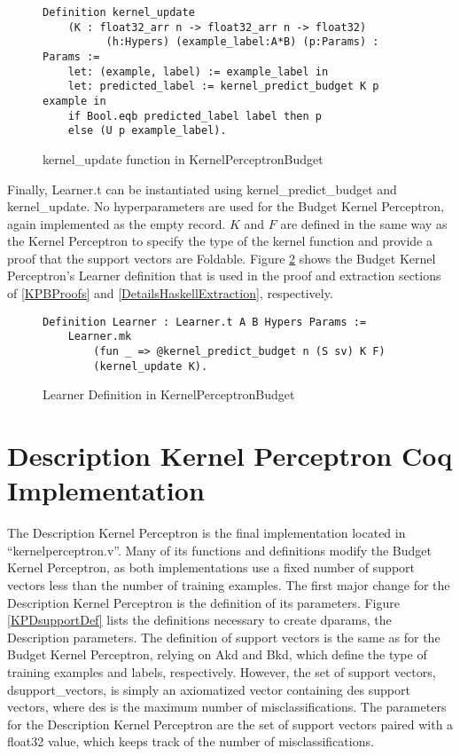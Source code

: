 \begin{figure}
    \caption{kernel\_update function in KernelPerceptronBudget}
    \label{kernel_update_budgetDef}
    \begin{lstlisting}
Definition kernel_update 
    (K : float32_arr n -> float32_arr n -> float32)
          (h:Hypers) (example_label:A*B) (p:Params) : Params :=
    let: (example, label) := example_label in 
    let: predicted_label := kernel_predict_budget K p example in
    if Bool.eqb predicted_label label then p
    else (U p example_label).
    \end{lstlisting}
\end{figure}

Finally, Learner.t can be instantiated using kernel\_predict\_budget and kernel\_update. No hyperparameters are used for the Budget Kernel Perceptron, again implemented as the empty record. $K$ and $F$ are defined in the same way as the Kernel Perceptron to specify the type of the kernel function and provide a proof that the support vectors are Foldable. Figure \ref{kpbLearnerDef} shows the Budget Kernel Perceptron's Learner definition that is used in the proof and extraction sections of \ref{KPBProofs} and \ref{DetailsHaskellExtraction}, respectively.

\begin{figure}
    \caption{Learner Definition in KernelPerceptronBudget}
    \label{kpbLearnerDef}
    \begin{lstlisting}
Definition Learner : Learner.t A B Hypers Params :=
    Learner.mk
        (fun _ => @kernel_predict_budget n (S sv) K F)
        (kernel_update K).
    \end{lstlisting}
\end{figure}

\section{Description Kernel Perceptron Coq Implementation}\label{KPDCoqImp}

The Description Kernel Perceptron is the final implementation located in ``kernelperceptron.v''. Many of its functions and definitions modify the Budget Kernel Perceptron, as both implementations use a fixed number of support vectors less than the number of training examples. The first major change for the Description Kernel Perceptron is the definition of its parameters. Figure \ref{KPDsupportDef} lists the definitions necessary to create dparams, the Description parameters. The definition of support vectors is the same as for the Budget Kernel Perceptron, relying on Akd and Bkd, which define the type of training examples and labels, respectively. However, the set of support vectors, dsupport\_vectors, is simply an axiomatized vector containing des support vectors, where des is the maximum number of misclassifications. The parameters for the Description Kernel Perceptron are the set of support vectors paired with a float32 value, which keeps track of the number of misclassifications.

